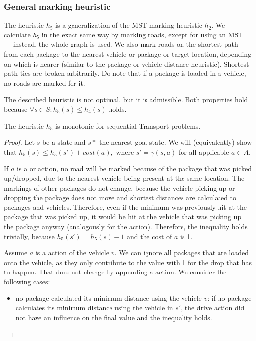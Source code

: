 \subsubsection{General marking heuristic}\label{sfa5}

The heuristic $h_5$ is a generalization of the MST marking heuristic $h_2$. We calculate $h_5$ in the exact same way by marking roads,
except for
using an MST --- instead, the whole graph is used.
We also mark roads on the shortest path from each package to the nearest
vehicle or package or target location, depending on which is nearer (similar
to the package or vehicle distance heuristic).
Shortest path ties are broken arbitrarily.
Do note that if a package is loaded in a vehicle, no roads are marked for it.

The described heuristic is not optimal, but it is admissible.
Both properties hold because $\forall s \in S : h_5(s) \leq h_4(s)$ holds.

\begin{thm}
The heuristic $h_5$ is monotonic for sequential Transport problems.
\end{thm}
\begin{proof}
Let $s$ be a state and $s*$ the nearest goal state.
We will (equivalently) show that $h_5(s) \leq h_5(s') + cost(a),$ where
$s' = \gamma(s, a)$ for all applicable $a \in A$.

If $a$ is a \pickup{} or \drop{} action,
no road will be marked because of the package that was picked up/dropped,
due to the nearest vehicle being present at the same location.
The markings of other packages do not change, because
the vehicle picking up or dropping the package does not move
and shortest distances are calculated to packages and vehicles.
Therefore, even if the minimum was previously hit at the package that was
picked up, it would be hit at the vehicle that was picking up
the package anyway (analogously for the \drop{} action).
Therefore, the inequality holds trivially, because $h_5(s') = h_5(s) - 1$ and the cost of $a$ is 1.

Assume $a$ is a \drive{} action of the vehicle $v$.
We can ignore all packages that are loaded onto the vehicle,
as they only contribute to the value with 1 for the drop
that has to happen. That does not change by appending a \drive{} action.
We consider the following cases:
\begin{itemize}
\item no package calculated its minimum distance using the vehicle $v$: if no package calculates its minimum distance using the vehicle
in $s'$, the drive action did not have an influence
on the final value and the inequality holds.
\end{itemize}
\end{proof}


